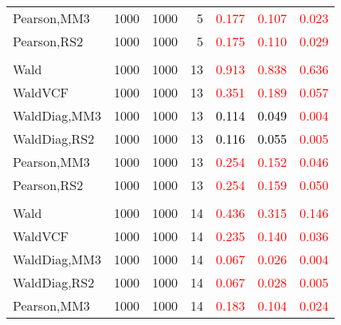 \documentclass[
]{article}
\begin{document}
\begin{table}[H]
{\begin{tabular}[t]{lrrrrrr}
\hspace{1em}Pearson,MM3 & 1000 & 1000 & 5 & \textcolor{red}{0.177} & \textcolor{red}{0.107} & \textcolor{red}{0.023}\\
\hspace{1em}Pearson,RS2 & 1000 & 1000 & 5 & \textcolor{red}{0.175} & \textcolor{red}{0.110} & \textcolor{red}{0.029}\\
\addlinespace[0.3em]
\multicolumn{7}{l}{\textbf{1F 15V}}\\
\hspace{1em}Wald & 1000 & 1000 & 13 & \textcolor{red}{0.913} & \textcolor{red}{0.838} & \textcolor{red}{0.636}\\
\hspace{1em}WaldVCF & 1000 & 1000 & 13 & \textcolor{red}{0.351} & \textcolor{red}{0.189} & \textcolor{red}{0.057}\\
\hspace{1em}WaldDiag,MM3 & 1000 & 1000 & 13 & \textcolor{black}{0.114} & \textcolor{black}{0.049} & \textcolor{red}{0.004}\\
\hspace{1em}WaldDiag,RS2 & 1000 & 1000 & 13 & \textcolor{black}{0.116} & \textcolor{black}{0.055} & \textcolor{red}{0.005}\\
\hspace{1em}Pearson,MM3 & 1000 & 1000 & 13 & \textcolor{red}{0.254} & \textcolor{red}{0.152} & \textcolor{red}{0.046}\\
\hspace{1em}Pearson,RS2 & 1000 & 1000 & 13 & \textcolor{red}{0.254} & \textcolor{red}{0.159} & \textcolor{red}{0.050}\\
\addlinespace[0.3em]
\multicolumn{7}{l}{\textbf{2F 10V}}\\
\hspace{1em}Wald & 1000 & 1000 & 14 & \textcolor{red}{0.436} & \textcolor{red}{0.315} & \textcolor{red}{0.146}\\
\hspace{1em}WaldVCF & 1000 & 1000 & 14 & \textcolor{red}{0.235} & \textcolor{red}{0.140} & \textcolor{red}{0.036}\\
\hspace{1em}WaldDiag,MM3 & 1000 & 1000 & 14 & \textcolor{red}{0.067} & \textcolor{red}{0.026} & \textcolor{red}{0.004}\\
\hspace{1em}WaldDiag,RS2 & 1000 & 1000 & 14 & \textcolor{red}{0.067} & \textcolor{red}{0.028} & \textcolor{red}{0.005}\\
\hspace{1em}Pearson,MM3 & 1000 & 1000 & 14 & \textcolor{red}{0.183} & \textcolor{red}{0.104} & \textcolor{red}{0.024}\\

\end{tabular}}
\end{table}
\end{document}
